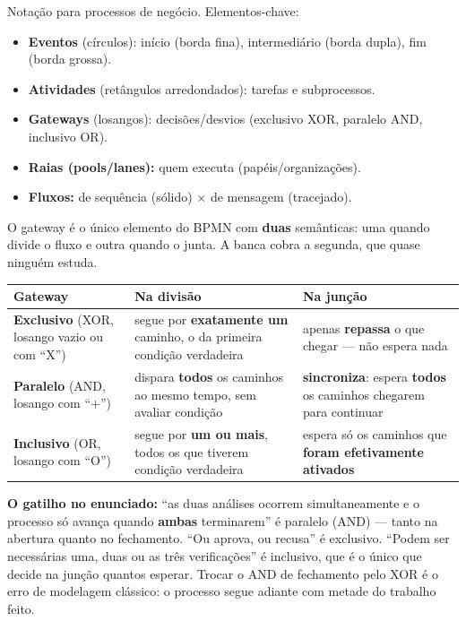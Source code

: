 Notação para processos de negócio. Elementos-chave:

\begin{itemize}
\item \textbf{Eventos} (círculos): início (borda fina), intermediário
(borda dupla), fim (borda grossa).
\item \textbf{Atividades} (retângulos arredondados): tarefas e
subprocessos.
\item \textbf{Gateways} (losangos): decisões/desvios (exclusivo XOR,
paralelo AND, inclusivo OR).
\item \textbf{Raias (pools/lanes):} quem executa (papéis/organizações).
\item \textbf{Fluxos:} de sequência (sólido) $\times$ de mensagem
(tracejado).
\end{itemize}

\begin{conceito}
O gateway é o único elemento do BPMN com \textbf{duas} semânticas: uma quando
divide o fluxo e outra quando o junta. A banca cobra a segunda, que quase
ninguém estuda.

\begin{center}
\begin{tabular}{@{}p{2.9cm}p{3.9cm}p{4.5cm}@{}}
\toprule
\textbf{Gateway} & \textbf{Na divisão} & \textbf{Na junção} \\
\midrule
\textbf{Exclusivo} (XOR, losango vazio ou com ``X'') & segue por
\textbf{exatamente um} caminho, o da primeira condição verdadeira & apenas
\textbf{repassa} o que chegar --- não espera nada \\
\textbf{Paralelo} (AND, losango com ``+'') & dispara \textbf{todos} os
caminhos ao mesmo tempo, sem avaliar condição & \textbf{sincroniza}: espera
\textbf{todos} os caminhos chegarem para continuar \\
\textbf{Inclusivo} (OR, losango com ``O'') & segue por \textbf{um ou mais},
todos os que tiverem condição verdadeira & espera só os caminhos que
\textbf{foram efetivamente ativados} \\
\bottomrule
\end{tabular}
\end{center}

\textbf{O gatilho no enunciado:} ``as duas análises ocorrem simultaneamente e
o processo só avança quando \textbf{ambas} terminarem'' é paralelo (AND) ---
tanto na abertura quanto no fechamento. ``Ou aprova, ou recusa'' é exclusivo.
``Podem ser necessárias uma, duas ou as três verificações'' é inclusivo, que é
o único que decide na junção quantos esperar. Trocar o AND de fechamento pelo
XOR é o erro de modelagem clássico: o processo segue adiante com metade do
trabalho feito.
\end{conceito}


